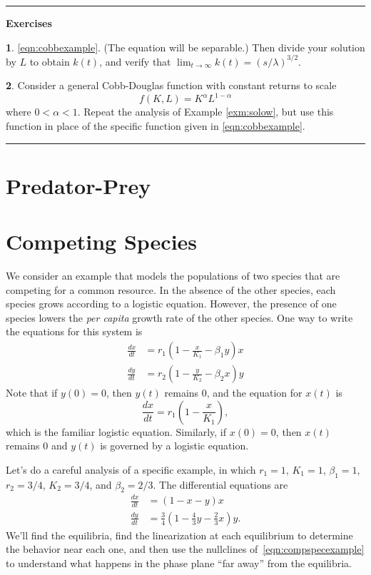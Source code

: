 \documentclass[reqno]{immbook}
\numberwithin{equation}{chapter}
\numberwithin{question}{section}
\numberwithin{theorem}{chapter}
\numberwithin{figure}{chapter}
\theoremstyle{definition}
\newtheorem{exercise}{}[section]
\newenvironment{exercises}%
{%
\medskip\hrule\medskip\noindent\textbf{Exercises}%
}%
{%
\medskip\hrule
}
\begin{document}
\begin{exercises}
\begin{exercise}
\eqref{eqn:cobbexample}.  (The equation will be separable.)
Then divide your solution by $L$ to obtain $k(t)$,
and verify that $\lim_{t\rightarrow\infty} k(t) =
\left(s/\lambda\right)^{3/2}$.
\end{exercise}
\begin{exercise}
Consider a general Cobb-Douglas function with
constant returns to scale
\begin{equation}
   f(K,L) = K^{\alpha}L^{1-\alpha}
\end{equation}
where $0 < \alpha < 1$.
Repeat the analysis of Example \ref{exm:solow},
but use this function in place of the
specific function given in \eqref{eqn:cobbexample}.
\end{exercise}
\end{exercises}
\newpage
%
\section{Predator-Prey}
%
\section{Competing Species}
%
We consider an example that models the populations
of two species that are competing for a common resource.
In the absence of the other species, each species
grows according to a logistic equation.
However, the presence of one species lowers
the \emph{per capita} growth rate of the other species.
One way to write the equations for this system
is
\begin{equation}
\begin{split}
  \frac{dx}{dt} & = r_1\left(1-\frac{x}{K_1}-\beta_1 y\right)x \\
  \frac{dy}{dt} & = r_2\left(1-\frac{y}{K_2}-\beta_2 x\right)y
\end{split}
\end{equation}
Note that if $y(0)=0$, then $y(t)$ remains $0$, and
the equation for $x(t)$ is
\begin{equation}
    \frac{dx}{dt} = r_1 \left(1-\frac{x}{K_1}\right),
\end{equation}
which is the familiar logistic equation.
Similarly, if $x(0)=0$, then $x(t)$ remains $0$ and
$y(t)$ is governed by a logistic equation.

Let's do a careful analysis of a specific example,
in which $r_1 = 1$, $K_1 = 1$, $\beta_1 = 1$, 
$r_2 = 3/4$, $K_2 = 3/4$, and $\beta_2 = 2/3$.
The differential equations are
\begin{equation}
\begin{split}
  \frac{dx}{dt} & = (1-x-y)x \\
  \frac{dy}{dt} & = \frac{3}{4}\left(1 -\frac{4}{3}y - \frac{2}{3}x\right)y .
\end{split}
\label{eqn:compspecexample}
\end{equation}
We'll find the equilibria, find the linearization at each
equilibrium to determine the behavior near each one, and then
use the nullclines of~\eqref{eqn:compspecexample} to understand
what happens in the phase plane ``far away'' from the equilibria.
\end{document}
